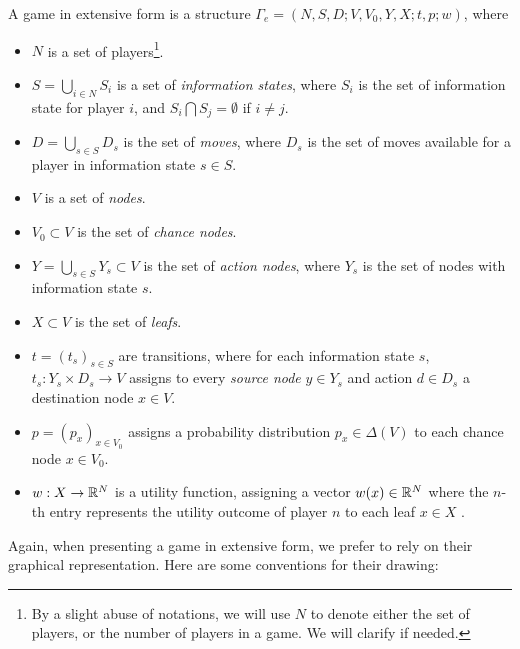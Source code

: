 \begin{definition}
\label{def:extform}
A game in extensive form is a structure $\Gamma_e = (N, S, D; V, V_0, Y, X; t, p; w)$,
where
\begin{itemize}
\item $N$ is a set of players\footnote{By a slight abuse of notations, we will use $N$ to denote either the set of players, or the number of players in a game. We will clarify if needed.}.
\item $S = \bigcup_{i \in N} S_i$ is a set of \emph{information states}, where $S_i$ is the set of information state for player $i$, and $S_i \bigcap S_j = \emptyset$ if $i  \neq j$.
\item $D = \bigcup_{s \in S} D_s$ is the set of \emph{moves}, where $D_s$ is the set of moves available for a  player in information state $s \in S$.
\item $V$ is a set of \emph{nodes}.
\item $V_0 \subset V$ is the set of \emph{chance nodes}.
\item $Y = \bigcup_{s \in S} Y_s \subset V$ is the set of \emph{action nodes}, where $Y_s$ is the set of nodes with information state $s$.
\item $X \subset V$ is the set of \emph{leafs}.
\item $t = (t_s)_{s \in S}$ are transitions, where for each information state $s$,  $t_s : Y_s \times D_s \rightarrow V$ assigns to every \emph{source node} $y \in Y_s$ and action $d \in D_s$ a destination node $x \in V$.
\item $p = (p_{x})_{x \in V_0}$ assigns a probability distribution $p_x \in \Delta(V)$ to each chance node $x \in V_0$.
\item $w : X \rightarrow \mathbb{R}^N$ is a utility function, assigning a vector $w(x) \in \mathbb{R}^N$ where the $n$-th entry represents the utility outcome of player $n$ to each leaf $x \in X$ .
\end{itemize}
\end{definition}

Again, when presenting a game in extensive form, we prefer to rely on their graphical representation. Here are some conventions for their drawing:


